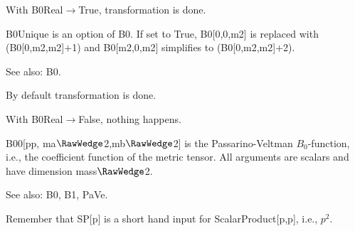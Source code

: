 
With B0Real\(\rightarrow \)True, transformation is done.





B0Unique is an option of B0. If set to True, B0[0,0,m2] is replaced with (B0[0,m2,m2]\(+\)1) and B0[m2,0,m2] simplifies to
  (B0[0,m2,m2]\(+\)2).

See also: B0.


By default transformation is done.





With B0Real\(\rightarrow \)False, nothing happens.





B00[pp, ma\(\RawWedge\)2,mb\(\RawWedge\)2] is the Passarino-Veltman \({B_0}\)-function, i.e., the coefficient function of the metric tensor. All
arguments are scalars and have dimension mass\(\RawWedge\)2.



See also:  B0, B1, PaVe.


Remember that SP[p] is a short hand input for ScalarProduct[p,p], i.e., \({p^2}\).

